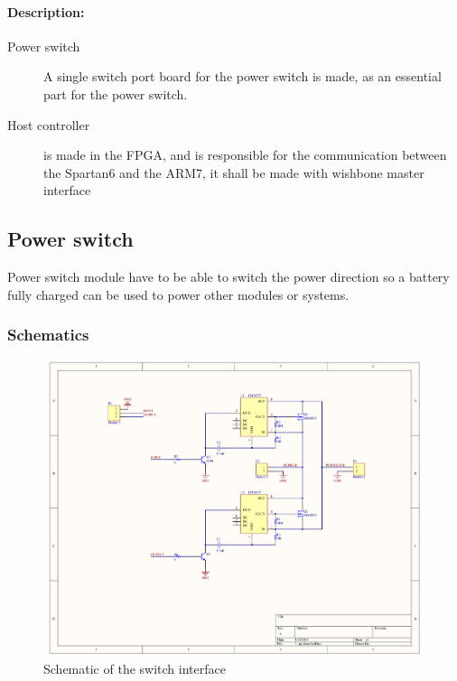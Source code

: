 \paragraph{Description:}
\begin{description}
	\item[Power switch] A single switch port board for the power switch is made, as an essential part for the power switch.
	\item[Host controller] is made in the FPGA, and is responsible for the communication between the Spartan6 and the ARM7, it shall be made with wishbone master interface 
\end{description}

\subsection{Power switch}
Power switch module have to be able to switch the power direction so a battery fully charged can be used to power other modules or systems.
\subsubsection{Schematics}

\begin{figure}[H]
	\begin{centering}
		 \includegraphics[width=1.0\textwidth,page=1]{images/ps_schematics.pdf}
		\caption{Schematic of the switch interface}
	\end{centering}
\end{figure}

